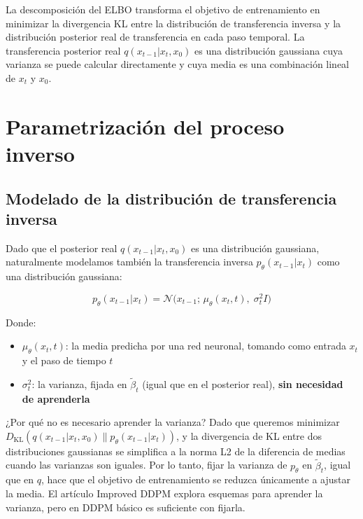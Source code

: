 \documentclass[a4paper]{article}
\begin{document}
La descomposición del ELBO transforma el objetivo de entrenamiento en minimizar la divergencia KL entre la distribución de transferencia inversa y la distribución posterior real de transferencia en cada paso temporal. La transferencia posterior real $q(x_{t-1}|x_t, x_0)$ es una distribución gaussiana cuya varianza se puede calcular directamente y cuya media es una combinación lineal de $x_t$ y $x_0$.



\section{Parametrización del proceso inverso}

\subsection{Modelado de la distribución de transferencia inversa}

Dado que el posterior real $q(x_{t-1}|x_t, x_0)$ es una distribución gaussiana, naturalmente modelamos también la transferencia inversa $p_\theta(x_{t-1}|x_t)$ como una distribución gaussiana:

$$p_\theta(x_{t-1}|x_t) = \mathcal{N}\big(x_{t-1};\, \mu_\theta(x_t, t),\; \sigma_t^2 I\big)$$

Donde:
\begin{itemize}
    \item $\mu_\theta(x_t, t)$: la media predicha por una red neuronal, tomando como entrada $x_t$ y el paso de tiempo $t$
    \item $\sigma_t^2$: la varianza, fijada en $\tilde{\beta}_t$ (igual que en el posterior real), \textbf{sin necesidad de aprenderla}
\end{itemize}

\begin{knowledgebox}{¿Por qué no es necesario aprender la varianza?}
Dado que queremos minimizar $D_{\text{KL}}(q(x_{t-1}|x_t,x_0) \| p_\theta(x_{t-1}|x_t))$, y la divergencia de KL entre dos distribuciones gaussianas se simplifica a la norma L2 de la diferencia de medias cuando las varianzas son iguales. Por lo tanto, fijar la varianza de $p_\theta$ en $\tilde{\beta}_t$, igual que en $q$, hace que el objetivo de entrenamiento se reduzca únicamente a ajustar la media. El artículo Improved DDPM explora esquemas para aprender la varianza, pero en DDPM básico es suficiente con fijarla.
\end{knowledgebox}
\end{document}
